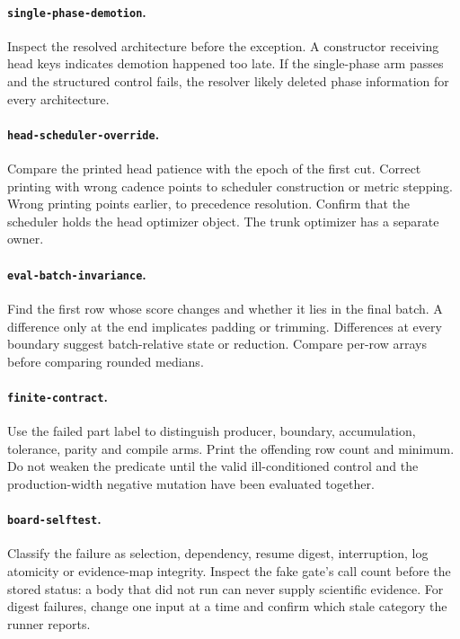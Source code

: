 \documentclass[10pt,aps,prd,twocolumn,nofootinbib]{revtex4-2}
\newcommand{\code}[1]{\texttt{#1}}
\begin{document}
\paragraph{\code{single-phase-demotion}.}
Inspect the resolved architecture before the exception.  A constructor
receiving head keys indicates demotion happened too late.  If the single-phase
arm passes and the structured control fails, the resolver likely deleted
phase information for every architecture.

\paragraph{\code{head-scheduler-override}.}
Compare the printed head patience with the epoch of the first cut.  Correct
printing with wrong cadence points to scheduler construction or metric
stepping.  Wrong printing points earlier, to precedence resolution.  Confirm
that the scheduler holds the head optimizer object.  The trunk optimizer has
a separate owner.

\paragraph{\code{eval-batch-invariance}.}
Find the first row whose score changes and whether it lies in the final batch.
A difference only at the end implicates padding or trimming.  Differences at
every boundary suggest batch-relative state or reduction.  Compare per-row
arrays before comparing rounded medians.

\paragraph{\code{finite-contract}.}
Use the failed part label to distinguish producer, boundary, accumulation,
tolerance, parity and compile arms.  Print the offending row count and
minimum.  Do not weaken the predicate until the valid ill-conditioned control
and the production-width negative mutation have been evaluated together.

\paragraph{\code{board-selftest}.}
Classify the failure as selection, dependency, resume digest, interruption,
log atomicity or evidence-map integrity.  Inspect the fake gate's call count
before the stored status: a body that did not run can never supply scientific
evidence.  For digest failures, change one input at a time and confirm which
stale category the runner reports.
\end{document}
